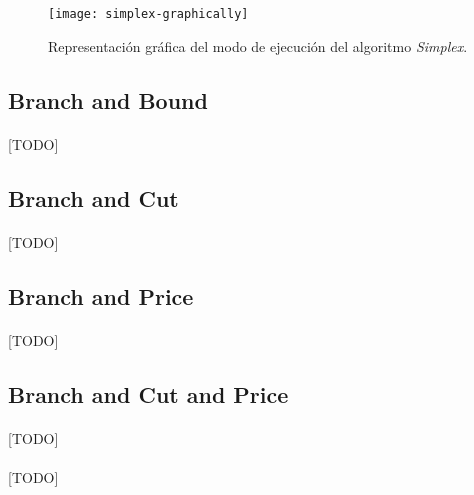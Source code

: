 \documentclass{subfiles}
\begin{document}
      \begin{figure}[ht]
        \centering
        \texttt{[image: simplex-graphically]}
        \caption{Representación gráfica del modo de ejecución del algoritmo \emph{Simplex}.}
        \label{img:solving_simplex}
      \end{figure}

      \subsection{Branch and Bound}
      \label{sec:solving_branch_bound}

        \paragraph{}
        [TODO]

      \subsection{Branch and Cut}
      \label{sec:solving_branch_cut}

        \paragraph{}
        [TODO]

      \subsection{Branch and Price}
      \label{sec:solving_branch_price}

        \paragraph{}
        [TODO]

      \subsection{Branch and Cut and Price}
      \label{sec:solving_branch_cut_price}

        \paragraph{}
        [TODO]

      \paragraph{}
      [TODO]
\end{document}
